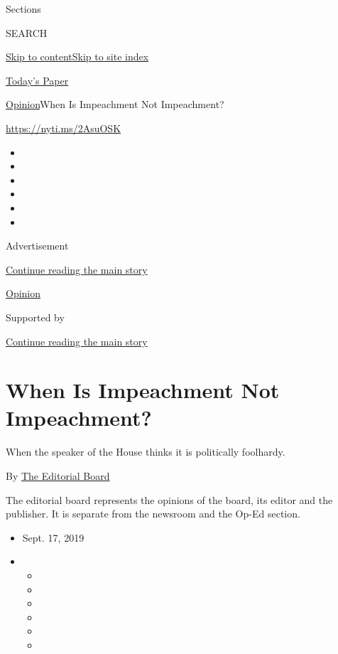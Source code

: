 Sections

SEARCH

\protect\hyperlink{site-content}{Skip to
content}\protect\hyperlink{site-index}{Skip to site index}

\href{https://myaccount.nytimes3xbfgragh.onion/auth/login?response_type=cookie\&client_id=vi}{}

\href{https://www.nytimes3xbfgragh.onion/section/todayspaper}{Today's
Paper}

\href{/section/opinion}{Opinion}\textbar{}When Is Impeachment Not
Impeachment?

\url{https://nyti.ms/2AsuOSK}

\begin{itemize}
\item
\item
\item
\item
\item
\item
\end{itemize}

Advertisement

\protect\hyperlink{after-top}{Continue reading the main story}

\href{/section/opinion}{Opinion}

Supported by

\protect\hyperlink{after-sponsor}{Continue reading the main story}

\hypertarget{when-is-impeachment-not-impeachment}{%
\section{When Is Impeachment Not
Impeachment?}\label{when-is-impeachment-not-impeachment}}

When the speaker of the House thinks it is politically foolhardy.

By
\href{https://www.nytimes3xbfgragh.onion/interactive/opinion/editorialboard.html}{The
Editorial Board}

The editorial board represents the opinions of the board, its editor and
the publisher. It is separate from the newsroom and the Op-Ed section.

\begin{itemize}
\item
  Sept. 17, 2019
\item
  \begin{itemize}
  \item
  \item
  \item
  \item
  \item
  \item
  \end{itemize}
\end{itemize}

